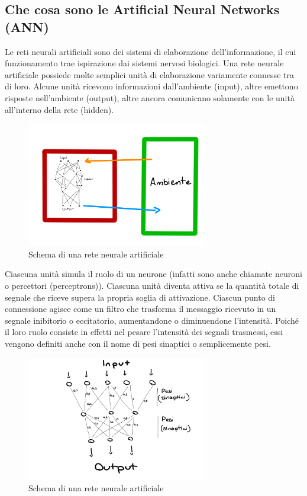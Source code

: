 \subsection{Che cosa sono le Artificial Neural Networks (ANN)}

Le reti neurali artificiali sono dei sistemi di elaborazione dell'informazione,
il cui funzionamento trae ispirazione dai sistemi nervosi biologici. Una rete
neurale artificiale possiede molte semplici unità di elaborazione variamente
connesse tra di loro.
Alcune unità ricevono informazioni dall'ambiente (input),
altre emettono risposte nell'ambiente (output), altre ancora comunicano
solamente con le unità all'interno della rete (hidden).

\begin{figure}[H]
	\centering
	\includegraphics[width=0.7\textwidth]{assets/ANN.png}
	\caption{Schema di una rete neurale artificiale}
\end{figure}

Ciascuna unità simula il ruolo di un neurone (infatti sono anche chiamate
neuroni o percettori (perceptrons)). Ciascuna unità diventa attiva se la
quantità totale di segnale che riceve supera la propria soglia di attivazione.
Ciascun punto di connessione agisce come un filtro che trasforma il messaggio
ricevuto in un segnale inibitorio o eccitatorio, aumentandone o diminuendone
l'intensità. Poiché il loro ruolo consiste in effetti nel pesare l'intensità dei
segnali trasmessi, essi vengono definiti anche con il nome di pesi sinaptici o
semplicemente pesi.

\begin{figure}[H]
	\centering
	\includegraphics[width=0.7\textwidth]{assets/Weights.png}
	\caption{Schema di una rete neurale artificiale}
\end{figure}

